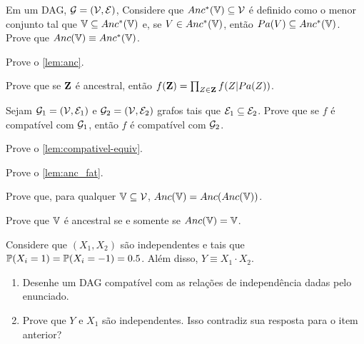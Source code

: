 \begin{exercise}
 Em um DAG, $\sG = (\sV, \sE)$,
 Considere que $Anc^*(\V) \subseteq \sV$ é
 definido como o menor conjunto tal que
 $\V \subseteq Anc^*(\V)$ e,
 se $V \in Anc^*(\V)$, então
 $Pa(V) \subseteq Anc^*(\V)$.
 Prove que $Anc(\V) \equiv Anc^*(\V)$.
\end{exercise}

\begin{exercise} 
 Prove o \cref{lem:anc}.
\end{exercise}

\begin{exercise}
 \label{lemma:anc_fact}
 Prove que se $\Z$ é ancestral, então
 $f(\Z) = \prod_{Z \in \Z}f(Z|Pa(Z))$. 
\end{exercise}

\begin{exercise}
 Sejam $\sG_1 = (\sV, \sE_1)$ e
 $\sG_2 = (\sV, \sE_2)$ grafos
 tais que $\sE_1 \subseteq \sE_2$.
 Prove que se 
 $f$ é compatível com $\sG_1$, então 
 $f$ é compatível com $\sG_2$.
\end{exercise}

\begin{exercise}
 Prove o \cref{lem:compativel-equiv}.
\end{exercise}

\begin{exercise}
 Prove o \cref{lem:anc_fat}.
\end{exercise}

\begin{exercise}
 Prove que, para qualquer $\V \subseteq \sV$,
 $Anc(\V) = Anc(Anc(\V))$.
\end{exercise}

\begin{exercise}
 Prove que $\V$ é ancestral se e somente se
 $Anc(\V) = \V$.
\end{exercise}

\begin{exercise}
 Considere que $(X_1,X_2)$ são independentes e
 tais que $\P(X_i=1)=\P(X_i=-1)=0.5$.
 Além disso, $Y \equiv X_1 \cdot X_2$.
 \begin{enumerate}[label=(\alph*)]
  \item Desenhe um DAG compatível
  com as relações de independência dadas pelo enunciado.
  \item Prove que $Y$ e $X_1$ são independentes.
  Isso contradiz sua resposta para o item anterior?
 \end{enumerate}
\end{exercise}

